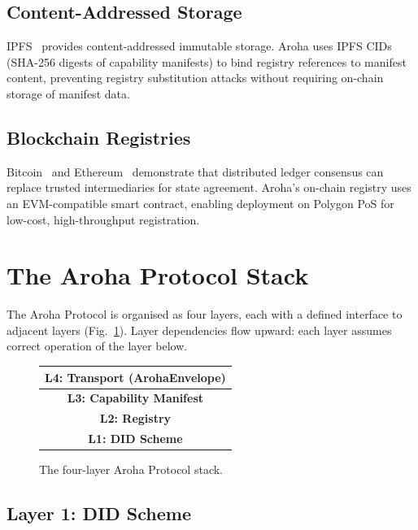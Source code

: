 \documentclass[conference]{IEEEtran}
\begin{document}
\subsection{Content-Addressed Storage}

IPFS~\cite{ipfs2014whitepaper} provides content-addressed
immutable storage. Aroha uses IPFS CIDs (SHA-256 digests of
capability manifests) to bind registry references to manifest
content, preventing registry substitution attacks without
requiring on-chain storage of manifest data.

\subsection{Blockchain Registries}

Bitcoin~\cite{nakamoto2008bitcoin} and
Ethereum~\cite{buterin2014ethereum} demonstrate that distributed
ledger consensus can replace trusted intermediaries for state
agreement. Aroha's on-chain registry uses an EVM-compatible
smart contract, enabling deployment on Polygon PoS for
low-cost, high-throughput registration.

\section{The Aroha Protocol Stack}
\label{sec:stack}

The Aroha Protocol is organised as four layers, each with a
defined interface to adjacent layers (Fig.~\ref{fig:stack}).
Layer dependencies flow upward: each layer assumes correct
operation of the layer below.

\begin{figure}[t]
\centering
\begin{tabular}{|c|}
\hline
\textbf{L4: Transport (ArohaEnvelope)} \\
\hline
\textbf{L3: Capability Manifest} \\
\hline
\textbf{L2: Registry} \\
\hline
\textbf{L1: DID Scheme} \\
\hline
\end{tabular}
\caption{The four-layer Aroha Protocol stack.}
\label{fig:stack}
\end{figure}

\subsection{Layer 1: DID Scheme}
\label{sec:l1}
\end{document}
